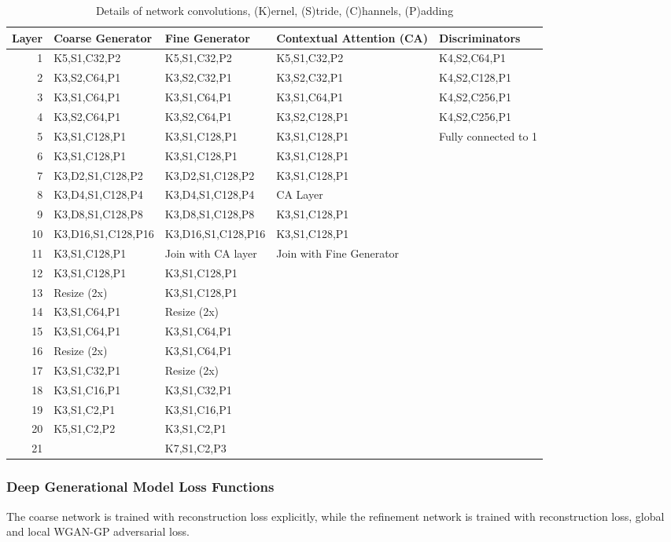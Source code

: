 \documentclass[twocolumn]{article}
\begin{document}
\begin{table*}[htbp]
\caption{\label{table:convolutions}Details of network convolutions, (K)ernel, (S)tride, (C)hannels, (P)adding}
\centering
\begin{tabular}{rllll}
Layer & Coarse Generator & Fine Generator & Contextual Attention (CA) & Discriminators\\[0pt]
\hline
1 & K5,S1,C32,P2 & K5,S1,C32,P2 & K5,S1,C32,P2 & K4,S2,C64,P1\\[0pt]
2 & K3,S2,C64,P1 & K3,S2,C32,P1 & K3,S2,C32,P1 & K4,S2,C128,P1\\[0pt]
3 & K3,S1,C64,P1 & K3,S1,C64,P1 & K3,S1,C64,P1 & K4,S2,C256,P1\\[0pt]
4 & K3,S2,C64,P1 & K3,S2,C64,P1 & K3,S2,C128,P1 & K4,S2,C256,P1\\[0pt]
5 & K3,S1,C128,P1 & K3,S1,C128,P1 & K3,S1,C128,P1 & Fully connected to 1\\[0pt]
6 & K3,S1,C128,P1 & K3,S1,C128,P1 & K3,S1,C128,P1 & \\[0pt]
7 & K3,D2,S1,C128,P2 & K3,D2,S1,C128,P2 & K3,S1,C128,P1 & \\[0pt]
8 & K3,D4,S1,C128,P4 & K3,D4,S1,C128,P4 & CA Layer & \\[0pt]
9 & K3,D8,S1,C128,P8 & K3,D8,S1,C128,P8 & K3,S1,C128,P1 & \\[0pt]
10 & K3,D16,S1,C128,P16 & K3,D16,S1,C128,P16 & K3,S1,C128,P1 & \\[0pt]
11 & K3,S1,C128,P1 & Join with CA layer & Join with Fine Generator & \\[0pt]
12 & K3,S1,C128,P1 & K3,S1,C128,P1 &  & \\[0pt]
13 & Resize (2x) & K3,S1,C128,P1 &  & \\[0pt]
14 & K3,S1,C64,P1 & Resize (2x) &  & \\[0pt]
15 & K3,S1,C64,P1 & K3,S1,C64,P1 &  & \\[0pt]
16 & Resize (2x) & K3,S1,C64,P1 &  & \\[0pt]
17 & K3,S1,C32,P1 & Resize (2x) &  & \\[0pt]
18 & K3,S1,C16,P1 & K3,S1,C32,P1 &  & \\[0pt]
19 & K3,S1,C2,P1 & K3,S1,C16,P1 &  & \\[0pt]
20 & K5,S1,C2,P2 & K3,S1,C2,P1 &  & \\[0pt]
21 &  & K7,S1,C2,P3 &  & \\[0pt]
\end{tabular}
\end{table*}


\subsubsection{Deep Generational Model Loss Functions}
\label{sec:org5ac7d10}
The coarse network is trained with reconstruction loss explicitly, while the refinement network is trained with reconstruction loss, global and local WGAN-GP adversarial loss.\autocite{yuGenerativeImageInpainting2018}
\end{document}
